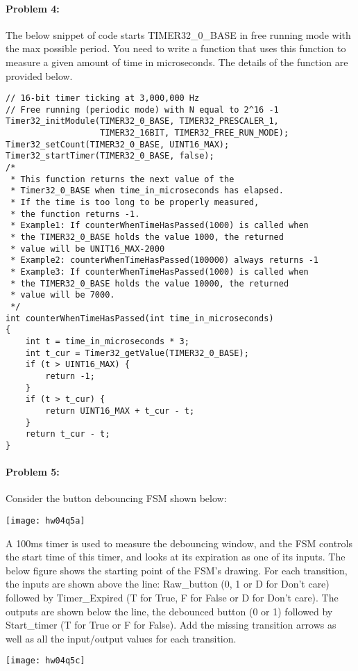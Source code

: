 \documentclass[12pt,letterpaper,titlepage]{article}
\begin{document}
\begin{raggedright}
\clearpage
\paragraph{Problem 4: }
The below snippet of code starts TIMER32\_0\_BASE in free running mode with the max possible period. You need to write a function that uses this function to measure a given amount of time in microseconds. The details of the function are provided below.

\begin{lstlisting}
// 16-bit timer ticking at 3,000,000 Hz
// Free running (periodic mode) with N equal to 2^16 -1
Timer32_initModule(TIMER32_0_BASE, TIMER32_PRESCALER_1,
                   TIMER32_16BIT, TIMER32_FREE_RUN_MODE);
Timer32_setCount(TIMER32_0_BASE, UINT16_MAX);
Timer32_startTimer(TIMER32_0_BASE, false);
/* 
 * This function returns the next value of the 
 * Timer32_0_BASE when time_in_microseconds has elapsed. 
 * If the time is too long to be properly measured, 
 * the function returns -1.
 * Example1: If counterWhenTimeHasPassed(1000) is called when 
 * the TIMER32_0_BASE holds the value 1000, the returned 
 * value will be UNIT16_MAX-2000
 * Example2: counterWhenTimeHasPassed(100000) always returns -1
 * Example3: If counterWhenTimeHasPassed(1000) is called when 
 * the TIMER32_0_BASE holds the value 10000, the returned 
 * value will be 7000.
 */
int counterWhenTimeHasPassed(int time_in_microseconds)
{
    int t = time_in_microseconds * 3;
    int t_cur = Timer32_getValue(TIMER32_0_BASE);
    if (t > UINT16_MAX) {
        return -1;
    }
    if (t > t_cur) {
        return UINT16_MAX + t_cur - t;
    }
    return t_cur - t;
}
\end{lstlisting}

\clearpage
\paragraph{Problem 5: }
Consider the button debouncing FSM shown below:

\begin{center}
\texttt{[image: hw04q5a]}
\end{center}

A 100ms timer is used to measure the debouncing window, and the FSM controls the start time of this timer, and looks at its expiration as one of its inputs. The below figure shows the starting point of the FSM’s drawing. For each transition, the inputs are shown above the line: Raw\_button (0, 1 or D for Don’t care) followed by Timer\_Expired (T for True, F for False or D for Don’t care). The outputs are shown below the line, the debounced button (0 or 1) followed by Start\_timer (T for True or F for False). Add the missing transition arrows as well as all the input/output values for each transition.

\begin{center}
\texttt{[image: hw04q5c]}
\end{center}

\end{raggedright}
\end{document}
